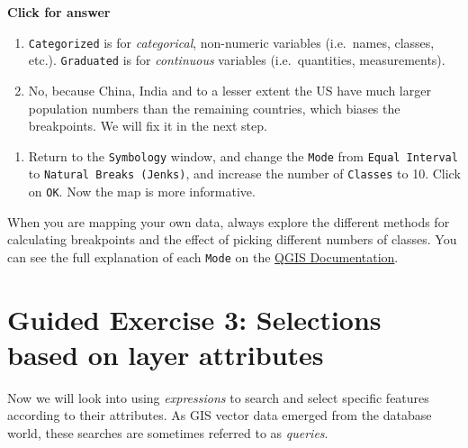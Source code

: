 \documentclass[
  letterpaper,
  DIV=11,
  numbers=noendperiod]{scrreprt}
\providecommand{\tightlist}{%
  \setlength{\itemsep}{0pt}\setlength{\parskip}{0pt}}\usepackage{longtable,booktabs,array}
\begin{document}
\begin{tcolorbox}[enhanced jigsaw, leftrule=.75mm, colframe=quarto-callout-important-color-frame, breakable, toprule=.15mm, bottomrule=.15mm, arc=.35mm, rightrule=.15mm, opacityback=0, colback=white, left=2mm]

\vspace{-3mm}\textbf{Click for answer}\vspace{3mm}

\begin{enumerate}
\def\labelenumi{\alph{enumi})}
\item
  \texttt{Categorized} is for \emph{categorical}, non-numeric variables
  (i.e.~names, classes, etc.). \texttt{Graduated} is for
  \emph{continuous} variables (i.e.~quantities, measurements).
\item
  No, because China, India and to a lesser extent the US have much
  larger population numbers than the remaining countries, which biases
  the breakpoints. We will fix it in the next step.
\end{enumerate}

\end{tcolorbox}

\begin{enumerate}
\def\labelenumi{(\arabic{enumi})}
\setcounter{enumi}{79}
\tightlist
\item
  Return to the \texttt{Symbology} window, and change the \texttt{Mode}
  from \texttt{Equal\ Interval} to \texttt{Natural\ Breaks\ (Jenks)},
  and increase the number of \texttt{Classes} to 10. Click on
  \texttt{OK}. Now the map is more informative.
\end{enumerate}

When you are mapping your own data, always explore the different methods
for calculating breakpoints and the effect of picking different numbers
of classes. You can see the full explanation of each \texttt{Mode} on
the
\href{https://docs.qgis.org/3.40/en/docs/user_manual/working_with_vector/vector_properties.html\#graduated-renderer}{QGIS
Documentation}.

\section{Guided Exercise 3: Selections based on layer
attributes}\label{guided-exercise-3-selections-based-on-layer-attributes}

Now we will look into using \emph{expressions} to search and select
specific features according to their attributes. As GIS vector data
emerged from the database world, these searches are sometimes referred
to as \emph{queries}.
\end{document}
